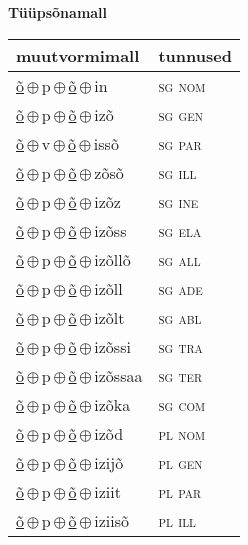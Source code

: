 

\vspace{3.5em}
\noindent \begin{minipage}{\textwidth}
\noindent \textbf{Tüüpsõnamall \,}\\

\begin{sideways}
\begin{tabular}{l l}
muutvormimall & tunnused \\
\hline
\underline{õ}\,$\oplus$\,p\,$\oplus$\,\underline{õ}\,$\oplus$\,in & \textsc{ sg nom } \\
\underline{õ}\,$\oplus$\,p\,$\oplus$\,\underline{õ}\,$\oplus$\,izõ & \textsc{ sg gen } \\
\underline{õ}\,$\oplus$\,v\,$\oplus$\,\underline{õ}\,$\oplus$\,issõ & \textsc{ sg par } \\
\underline{õ}\,$\oplus$\,p\,$\oplus$\,\underline{õ}\,$\oplus$\,zõsõ & \textsc{ sg ill } \\
\underline{õ}\,$\oplus$\,p\,$\oplus$\,\underline{õ}\,$\oplus$\,izõz & \textsc{ sg ine } \\
\underline{õ}\,$\oplus$\,p\,$\oplus$\,\underline{õ}\,$\oplus$\,izõss & \textsc{ sg ela } \\
\underline{õ}\,$\oplus$\,p\,$\oplus$\,\underline{õ}\,$\oplus$\,izõllõ & \textsc{ sg all } \\
\underline{õ}\,$\oplus$\,p\,$\oplus$\,\underline{õ}\,$\oplus$\,izõll & \textsc{ sg ade } \\
\underline{õ}\,$\oplus$\,p\,$\oplus$\,\underline{õ}\,$\oplus$\,izõlt & \textsc{ sg abl } \\
\underline{õ}\,$\oplus$\,p\,$\oplus$\,\underline{õ}\,$\oplus$\,izõssi & \textsc{ sg tra } \\
\underline{õ}\,$\oplus$\,p\,$\oplus$\,\underline{õ}\,$\oplus$\,izõssaa & \textsc{ sg ter } \\
\underline{õ}\,$\oplus$\,p\,$\oplus$\,\underline{õ}\,$\oplus$\,izõka & \textsc{ sg com } \\
\underline{õ}\,$\oplus$\,p\,$\oplus$\,\underline{õ}\,$\oplus$\,izõd & \textsc{ pl nom } \\
\underline{õ}\,$\oplus$\,p\,$\oplus$\,\underline{õ}\,$\oplus$\,izijõ & \textsc{ pl gen } \\
\underline{õ}\,$\oplus$\,p\,$\oplus$\,\underline{õ}\,$\oplus$\,iziit & \textsc{ pl par } \\
\underline{õ}\,$\oplus$\,p\,$\oplus$\,\underline{õ}\,$\oplus$\,iziisõ & \textsc{ pl ill } \\

\end{tabular}
\end{sideways}
\end{minipage}
